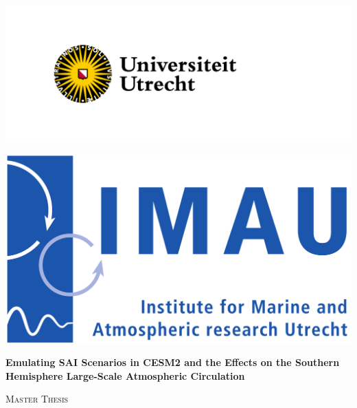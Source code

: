 
\begin{titlepage} %
	\noindent
    \begin{minipage}{0.4\textwidth}
        \includegraphics[height=0.2\textheight]{UU_logo_2021_NL_RGB.png}
    \end{minipage}\hfill
    \begin{minipage}{0.4\textwidth}
        \includegraphics[height=0.1\textheight]{logoIMAU_hd.png} 
    \end{minipage}
    \par\vspace{0.5cm}
    \begin{center}
    {\huge\bfseries Emulating SAI Scenarios in CESM2 and the Effects on the Southern Hemisphere Large-Scale Atmospheric Circulation\par} %
    \end{center}
	\vspace{1cm}
    {\scshape\Large Master Thesis\par}

\end{titlepage}
